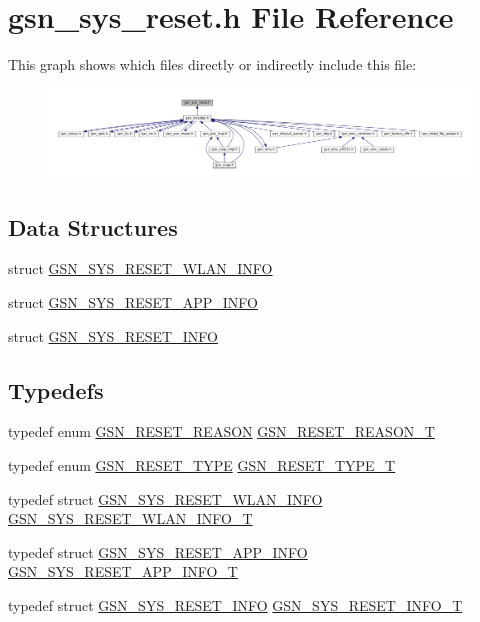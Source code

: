 \hypertarget{a00594}{
\section{gsn\_\-sys\_\-reset.h File Reference}
\label{a00594}
}
This graph shows which files directly or indirectly include this file:
\nopagebreak
\begin{figure}[H]
\begin{center}
\leavevmode
\includegraphics[width=400pt]{a00839}
\end{center}
\end{figure}
\subsection*{Data Structures}
\begin{DoxyCompactItemize}
\item 
struct \hyperlink{a00258}{GSN\_\-SYS\_\-RESET\_\-WLAN\_\-INFO}
\item 
struct \hyperlink{a00256}{GSN\_\-SYS\_\-RESET\_\-APP\_\-INFO}
\item 
struct \hyperlink{a00257}{GSN\_\-SYS\_\-RESET\_\-INFO}
\end{DoxyCompactItemize}
\subsection*{Typedefs}
\begin{DoxyCompactItemize}
\item 
typedef enum \hyperlink{a00594_acbd18ae49fbafe15903e1cf609761301}{GSN\_\-RESET\_\-REASON} \hyperlink{a00594_af75d4e3d8c25ba12e31e4f9c24d5a8f1}{GSN\_\-RESET\_\-REASON\_\-T}
\item 
typedef enum \hyperlink{a00594_ab40c966b5421550aa37ce97baba465ca}{GSN\_\-RESET\_\-TYPE} \hyperlink{a00594_a20fcaa965cfca6a82c70751abf38ab32}{GSN\_\-RESET\_\-TYPE\_\-T}
\item 
typedef struct \hyperlink{a00258}{GSN\_\-SYS\_\-RESET\_\-WLAN\_\-INFO} \hyperlink{a00594_a106991c129bd30cf0dcffadf0215d533}{GSN\_\-SYS\_\-RESET\_\-WLAN\_\-INFO\_\-T}
\item 
typedef struct \hyperlink{a00256}{GSN\_\-SYS\_\-RESET\_\-APP\_\-INFO} \hyperlink{a00594_aea86e9069b25443b95feb725c7c647a9}{GSN\_\-SYS\_\-RESET\_\-APP\_\-INFO\_\-T}
\item 
typedef struct \hyperlink{a00257}{GSN\_\-SYS\_\-RESET\_\-INFO} \hyperlink{a00594_aea2dc1fe4318fc9bc687d85a312f3c43}{GSN\_\-SYS\_\-RESET\_\-INFO\_\-T}
\end{DoxyCompactItemize}
